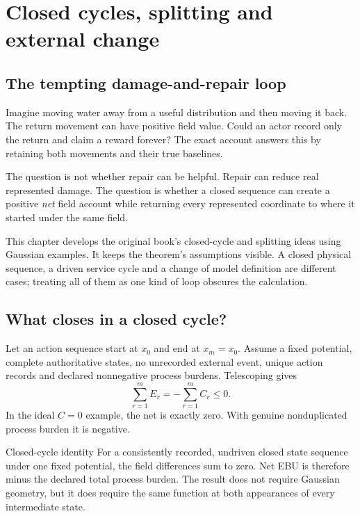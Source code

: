 \chapter{Closed cycles, splitting and external change}\label{ch:cycles}

\section{The tempting damage-and-repair loop}
Imagine moving water away from a useful distribution and then moving it back. The return movement can have positive field value. Could an actor record only the return and claim a reward forever? The exact account answers this by retaining both movements and their true baselines.

The question is not whether repair can be helpful. Repair can reduce real represented damage. The question is whether a closed sequence can create a positive \emph{net} field account while returning every represented coordinate to where it started under the same field.

This chapter develops the original book's closed-cycle and splitting ideas using Gaussian examples. It keeps the theorem's assumptions visible. A closed physical sequence, a driven service cycle and a change of model definition are different cases; treating all of them as one kind of loop obscures the calculation.

\section{What closes in a closed cycle?}
Let an action sequence start at $x_0$ and end at $x_m=x_0$. Assume a fixed potential, complete authoritative states, no unrecorded external event, unique action records and declared nonnegative process burdens. Telescoping gives
\begin{equation}\label{eq:cycle}
 \sum_{r=1}^{m}E_r=-\sum_{r=1}^{m}C_r\le0.
\end{equation}
In the ideal $C=0$ example, the net is exactly zero. With genuine nonduplicated process burden it is negative.

\begin{lawbox}{Closed-cycle identity}
For a consistently recorded, undriven closed state sequence under one fixed potential, the field differences sum to zero. Net EBU is therefore minus the declared total process burden. The result does not require Gaussian geometry, but it does require the same function at both appearances of every intermediate state.
\end{lawbox}

